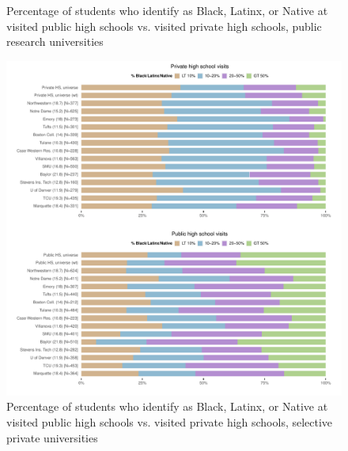 \documentclass[
  12pt,
]{article}
\begin{document}
\begin{landscape}
\begin{figure}
{}

\caption{Percentage of students who identify as Black, Latinx, or Native at visited public high schools vs. visited private high schools, public research universities}\label{fig:race-pubu-privhs-pubhs}
\end{figure}

\newpage

\begin{figure}

{\centering \includegraphics[width=2\linewidth]{./ego_network_race_privu_privhs_pubhs} 

}

\caption{Percentage of students who identify as Black, Latinx, or Native at visited public high schools vs. visited private high schools, selective private universities}\label{fig:race-privu-privhs-pubhs}
\end{figure}

\newpage

\begin{figure}


\end{figure}
\end{landscape}
\end{document}
